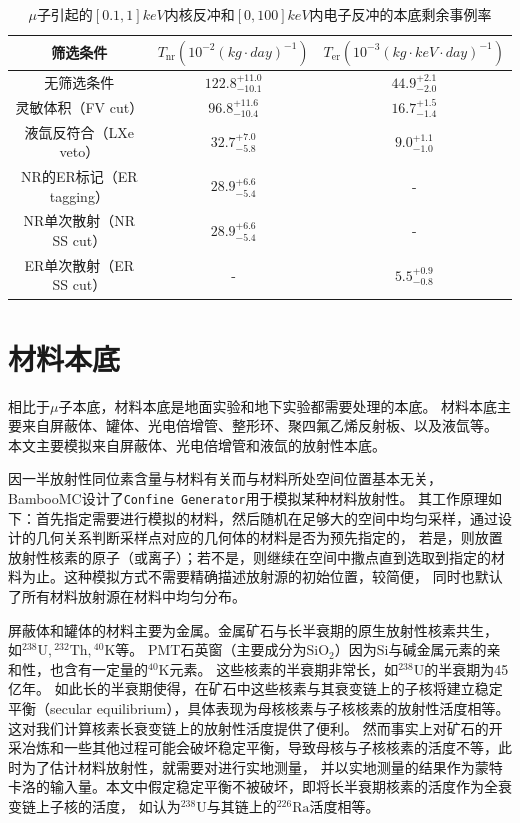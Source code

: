 \begin{table}
  \centering
  \caption{$\mu$子引起的$[0.1,1]\si{keV}$内核反冲和$[0,100]\si{keV}$内电子反冲的本底剩余事例率}
  \begin{tabular}{ccc}
    \toprule
    筛选条件 & $T_\mathrm{nr}\left(10^{-2}\left(\si{kg}\cdot\si{day}\right)^{-1}\right)$ & $T_\mathrm{er}\left(10^{-3}\left(\si{kg}\cdot\si{keV}\cdot\si{day}\right)^{-1}\right)$ \\
    \midrule
    无筛选条件 & $122.8_{-10.1}^{+11.0}$ & $44.9_{-2.0}^{+2.1}$ \\
    灵敏体积（FV cut） & $96.8_{-10.4}^{+11.6}$ & $16.7_{-1.4}^{+1.5}$ \\
    液氙反符合（LXe veto） & $32.7_{-5.8}^{+7.0}$ & $9.0_{-1.0}^{+1.1}$ \\
    NR的ER标记（ER tagging） & $28.9_{-5.4}^{+6.6}$ & - \\
    NR单次散射（NR SS cut） & $28.9_{-5.4}^{+6.6}$ & - \\
    ER单次散射（ER SS cut） & - & $5.5_{-0.8}^{+0.9}$ \\
    \bottomrule
  \end{tabular}
  \label{tab:cuts_muon_remain}
\end{table}

\section{材料本底}

相比于$\mu$子本底，材料本底是地面实验和地下实验都需要处理的本底。
材料本底主要来自屏蔽体、罐体、光电倍增管、整形环、聚四氟乙烯反射板、以及液氙等。
本文主要模拟来自屏蔽体、光电倍增管和液氙的放射性本底。

因一半放射性同位素含量与材料有关而与材料所处空间位置基本无关，BambooMC设计了\verb|Confine Generator|用于模拟某种材料放射性。
其工作原理如下：首先指定需要进行模拟的材料，然后随机在足够大的空间中均匀采样，通过设计的几何关系判断采样点对应的几何体的材料是否为预先指定的，
若是，则放置放射性核素的原子（或离子）；若不是，则继续在空间中撒点直到选取到指定的材料为止。这种模拟方式不需要精确描述放射源的初始位置，较简便，
同时也默认了所有材料放射源在材料中均匀分布。

屏蔽体和罐体的材料主要为金属。金属矿石与长半衰期的原生放射性核素共生，
如${}^{238}\mathrm{U},{}^{232}\mathrm{Th},{}^{40}\mathrm{K}$等。
PMT石英窗（主要成分为$\mathrm{Si}\mathrm{O}_2$）因为$\mathrm{Si}$与碱金属元素的亲和性，也含有一定量的${}^{40}\mathrm{K}$元素。
这些核素的半衰期非常长，如${}^{238}\mathrm{U}$的半衰期为45亿年。
如此长的半衰期使得，在矿石中这些核素与其衰变链上的子核将建立稳定平衡（secular equilibrium），具体表现为母核核素与子核核素的放射性活度相等。
这对我们计算核素长衰变链上的放射性活度提供了便利。
然而事实上对矿石的开采冶炼和一些其他过程可能会破坏稳定平衡，导致母核与子核核素的活度不等，此时为了估计材料放射性，就需要对进行实地测量，
并以实地测量的结果作为蒙特卡洛的输入量。本文中假定稳定平衡不被破坏，即将长半衰期核素的活度作为全衰变链上子核的活度，
如认为${}^{238}\mathrm{U}$与其链上的${}^{226}\mathrm{Ra}$活度相等。

